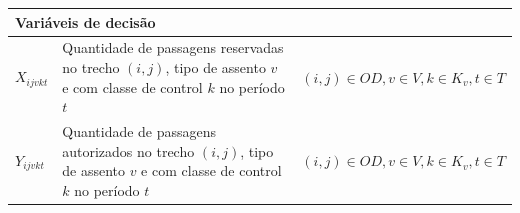 \begin{table}[H]
\begin{tabular}{p{2cm} p{9.5cm} p{3.2cm}}
		\multicolumn{3}{l}{\textbf{Variáveis de decisão}}                                                                                                                                                                                                                                                                                                                                                                                                                                                 \\ \midrule
		$X_{ijvkt}$        & Quantidade de passagens reservadas no trecho $(i,j)$, tipo de assento $v$ e com classe de control $k$ no período $t$                                                                                                                                                                                                                                                                                                                    & $(i,j) \in OD, v \in V, k \in K_v, t \in T$  \\
		$Y_{ijvkt}$        & Quantidade de passagens autorizados no trecho $(i,j)$, tipo de assento $v$ e com classe de control $k$ no período $t$                                                                                                                                                                                                                                                                                                                   & $(i,j) \in OD, v \in V, k \in K_v, t \in T$  \\

\end{tabular}
\end{table}
